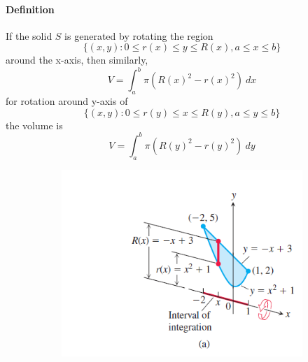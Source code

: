 \documentclass[12pt]{article}
\begin{document}
\paragraph{Definition}
If the solid $S$ is generated by rotating the region 
\[
    \{(x, y) : 0 \leq r(x) \leq y \leq R(x), a \leq x \leq b \}
\]
around the x-axis, then similarly,
\[
    V = \int_a^b \pi(R(x)^2 - r(x)^2)\: dx
\]
for rotation around y-axis of
\[
    \{(x, y) : 0 \leq r(y) \leq x \leq R(y), a \leq y \leq b \}
\]
the volume is 
\[
    V = \int_a^b \pi(R(y)^2 - r(y)^2)\: dy
\]
\begin{figure}[H]
    \centering
    \begin{subfigure}[b]{0.4\linewidth} 
         \includegraphics[width = 1\linewidth]{Images/washer method.png}
    \end{subfigure}
    \begin{subfigure}[b]{0.25\linewidth} 

\end{subfigure}
\end{figure}
\end{document}

